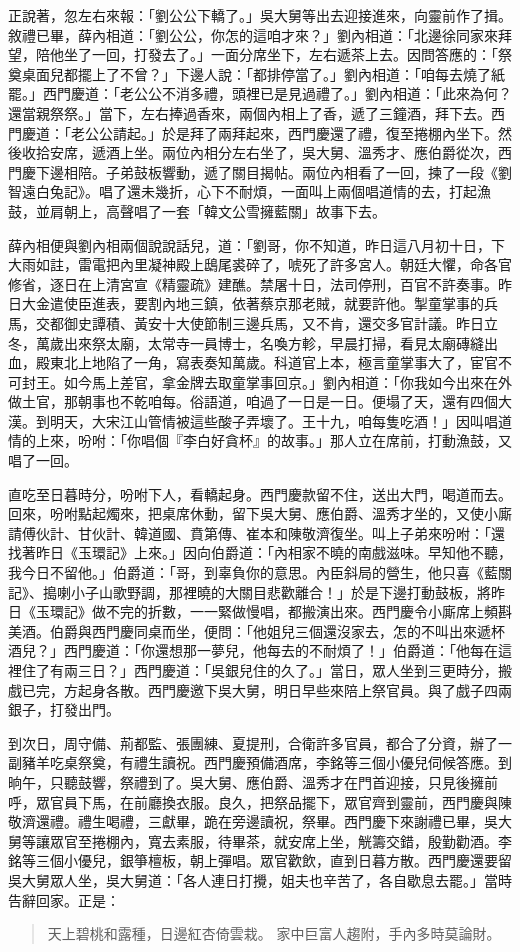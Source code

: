 正說著，忽左右來報：「劉公公下轎了。」吳大舅等出去迎接進來，向靈前作了揖。敘禮已畢，薛內相道：「劉公公，你怎的這咱才來？」劉內相道：「北邊徐同家來拜望，陪他坐了一回，打發去了。」一面分席坐下，左右遞茶上去。因問答應的：「祭奠桌面兒都擺上了不曾？」下邊人說：「都排停當了。」劉內相道：「咱每去燒了紙罷。」西門慶道：「老公公不消多禮，頭裡已是見過禮了。」劉內相道：「此來為何？還當親祭祭。」當下，左右捧過香來，兩個內相上了香，遞了三鐘酒，拜下去。西門慶道：「老公公請起。」於是拜了兩拜起來，西門慶還了禮，復至捲棚內坐下。然後收拾安席，遞酒上坐。兩位內相分左右坐了，吳大舅、溫秀才、應伯爵從次，西門慶下邊相陪。子弟鼓板響動，遞了關目揭帖。兩位內相看了一回，揀了一段《劉智遠白兔記》。唱了還未幾折，心下不耐煩，一面叫上兩個唱道情的去，打起漁鼓，並肩朝上，高聲唱了一套「韓文公雪擁藍關」故事下去。

薛內相便與劉內相兩個說說話兒，道：「劉哥，你不知道，昨日這八月初十日，下大雨如註，雷電把內里凝神殿上鴟尾裘碎了，唬死了許多宮人。朝廷大懼，命各官修省，逐日在上清宮宣《精靈疏》建醮。禁屠十日，法司停刑，百官不許奏事。昨日大金遣使臣進表，要割內地三鎮，依著蔡京那老賊，就要許他。掣童掌事的兵馬，交都御史譚積、黃安十大使節制三邊兵馬，又不肯，還交多官計議。昨日立冬，萬歲出來祭太廟，太常寺一員博士，名喚方軫，早晨打掃，看見太廟磚縫出血，殿東北上地陷了一角，寫表奏知萬歲。科道官上本，極言童掌事大了，宦官不可封王。如今馬上差官，拿金牌去取童掌事回京。」劉內相道：「你我如今出來在外做土官，那朝事也不乾咱每。俗語道，咱過了一日是一日。便塌了天，還有四個大漢。到明天，大宋江山管情被這些酸子弄壞了。王十九，咱每隻吃酒！」因叫唱道情的上來，吩咐：「你唱個『李白好貪杯』的故事。」那人立在席前，打動漁鼓，又唱了一回。

直吃至日暮時分，吩咐下人，看轎起身。西門慶款留不住，送出大門，喝道而去。回來，吩咐點起燭來，把桌席休動，留下吳大舅、應伯爵、溫秀才坐的，又使小廝請傅伙計、甘伙計、韓道國、賁第傳、崔本和陳敬濟復坐。叫上子弟來吩咐：「還找著昨日《玉環記》上來。」因向伯爵道：「內相家不曉的南戲滋味。早知他不聽，我今日不留他。」伯爵道：「哥，到辜負你的意思。內臣斜局的營生，他只喜《藍關記》、搗喇小子山歌野調，那裡曉的大關目悲歡離合！」於是下邊打動鼓板，將昨日《玉環記》做不完的折數，一一緊做慢唱，都搬演出來。西門慶令小廝席上頻斟美酒。伯爵與西門慶同桌而坐，便問：「他姐兒三個還沒家去，怎的不叫出來遞杯酒兒？」西門慶道：「你還想那一夢兒，他每去的不耐煩了！」伯爵道：「他每在這裡住了有兩三日？」西門慶道：「吳銀兒住的久了。」當日，眾人坐到三更時分，搬戲已完，方起身各散。西門慶邀下吳大舅，明日早些來陪上祭官員。與了戲子四兩銀子，打發出門。

到次日，周守備、荊都監、張團練、夏提刑，合衛許多官員，都合了分資，辦了一副豬羊吃桌祭奠，有禮生讀祝。西門慶預備酒席，李銘等三個小優兒伺候答應。到晌午，只聽鼓響，祭禮到了。吳大舅、應伯爵、溫秀才在門首迎接，只見後擁前呼，眾官員下馬，在前廳換衣服。良久，把祭品擺下，眾官齊到靈前，西門慶與陳敬濟還禮。禮生喝禮，三獻畢，跪在旁邊讀祝，祭畢。西門慶下來謝禮已畢，吳大舅等讓眾官至捲棚內，寬去素服，待畢茶，就安席上坐，觥籌交錯，殷勤勸酒。李銘等三個小優兒，銀箏檀板，朝上彈唱。眾官歡飲，直到日暮方散。西門慶還要留吳大舅眾人坐，吳大舅道：「各人連日打攪，姐夫也辛苦了，各自歇息去罷。」當時告辭回家。正是：
\begin{quote}
天上碧桃和露種，日邊紅杏倚雲栽。
家中巨富人趨附，手內多時莫論財。
\end{quote}

